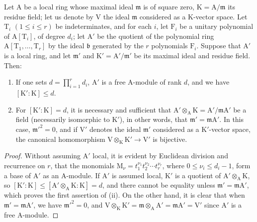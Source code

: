 \begin{proposition}[22.4.1]
\label{0.22.4.1}
Let $\mathrm{A}$ be a local ring whose maximal ideal $\mathfrak{m}$ is of square zero, $\mathrm{K}=\mathrm{A}/\mathfrak{m}$ its residue field; let us denote by $\mathrm{V}$ the ideal $\mathfrak{m}$ considered as a $\mathrm{K}$-vector space.
Let $\mathrm{T}_i$ $(1\leq i\leq r)$ be indeterminates, and for each $i$, let $\mathrm{F}_i$ be a unitary polynomial of $\mathrm{A}[\mathrm{T}_i]$, of degree $d_i$; let $\mathrm{A}'$ be the quotient of the polynomial ring $\mathrm{A}[\mathrm{T}_1,\ldots,\mathrm{T}_r]$ by the ideal $\mathfrak{b}$ generated by the $r$ polynomials $\mathrm{F}_i$.
Suppose that $\mathrm{A}'$ is a local ring, and let $\mathfrak{m}'$ and $\mathrm{K}'=\mathrm{A}'/\mathfrak{m}'$ be its maximal ideal and residue field.
Then:
\begin{enumerate}
  \item[\rm{(i)}] If one sets $d=\prod_{i=1}^r d_i$, $\mathrm{A}'$ is a free $\mathrm{A}$-module of rank $d$, and we have $[\mathrm{K}':\mathrm{K}]\leq d$.
  \item[\rm{(ii)}] For $[\mathrm{K}':\mathrm{K}]=d$, it is necessary and sufficient that $\mathrm{A}'\otimes_\mathrm{A}\mathrm{K}=\mathrm{A}'/\mathfrak{m}\mathrm{A}'$ be a field (necessarily isomorphic to $\mathrm{K}'$), in other words, that $\mathfrak{m}'=\mathfrak{m}\mathrm{A}'$.
  In this case, $\mathfrak{m}'^2=0$, and if $\mathrm{V}'$ denotes the ideal $\mathfrak{m}'$ considered as a $\mathrm{K}'$-vector space, the canonical homomorphism $\mathrm{V}\otimes_\mathrm{K}\mathrm{K}'\to\mathrm{V}'$ is bijective.
\end{enumerate}
\end{proposition}

\begin{proof}
Without assuming $\mathrm{A}'$ local, it is evident by Euclidean division and recurrence on $r$, that the monomials $\mathrm{M}_\nu=t_1^{\nu_1}t_2^{\nu_2}\cdots t_r^{\nu_r}$, where $0\leq\nu_i\leq d_i-1$, form a base of $\mathrm{A}'$ as an $\mathrm{A}$-module.
If $\mathrm{A}'$ is assumed local, $\mathrm{K}'$ is a quotient of $\mathrm{A}'\otimes_\mathrm{A}\mathrm{K}$, so $[\mathrm{K}':\mathrm{K}]\leq[\mathrm{A}'\otimes_\mathrm{A}\mathrm{K}:\mathrm{K}]=d$, and there cannot be equality unless $\mathfrak{m}'=\mathfrak{m}\mathrm{A}'$, which proves the first assertion of (ii).
On the other hand, it is clear that when $\mathfrak{m}'=\mathfrak{m}\mathrm{A}'$, we have $\mathfrak{m}'^2=0$, and $\mathrm{V}\otimes_\mathrm{K}\mathrm{K}'=\mathfrak{m}\otimes_\mathrm{A}\mathrm{A}'=\mathfrak{m}\mathrm{A}'=\mathrm{V}'$ since $\mathrm{A}'$ is a free $\mathrm{A}$-module.
\end{proof}

